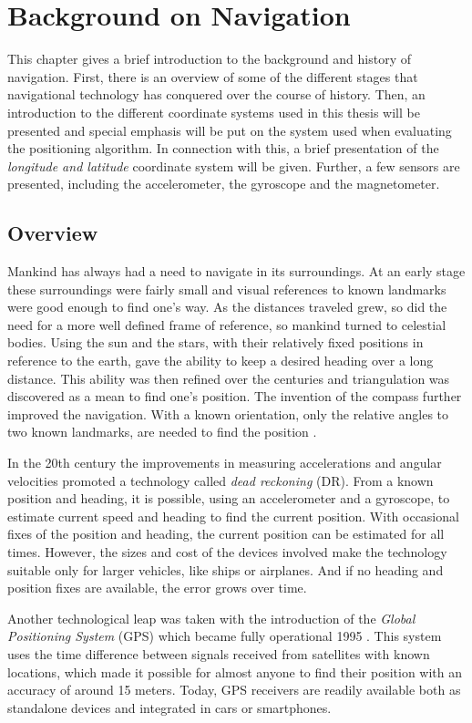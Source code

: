 \documentclass{LTHthesis}
\begin{document}
\chapter{Background on Navigation}
\label{chap:background}
%
This chapter gives a brief introduction to the background and history of navigation. First, there is an overview of some of the different stages that navigational technology has conquered over the course of history. Then, an introduction to the different coordinate systems used in this thesis will be presented and special emphasis will be put on the system used when evaluating the positioning algorithm. In connection with this, a brief presentation of the \emph{longitude and latitude} coordinate system will be given. Further, a few sensors are presented, including the accelerometer, the gyroscope and the magnetometer.
%
\section{Overview}
%
Mankind has always had a need to navigate in its surroundings. At an early stage these surroundings were fairly small and visual references to known landmarks were good enough to find one's way. As the distances traveled grew, so did the need for a more well defined frame of reference, so mankind turned to celestial bodies. Using the sun and the stars, with their relatively fixed positions in reference to the earth, gave the ability to keep a desired heading over a long distance. This ability was then refined over the centuries and triangulation was discovered as a mean to find one's position. The invention of the compass further improved the navigation. With a known orientation, only the relative angles to two known landmarks, are needed to find the position \cite{nav}. 

In the 20th century the improvements in measuring accelerations and angular velocities promoted a technology called \emph{dead reckoning} (DR)\cite{gson12,fig_fra10}. From a known position and heading, it is possible, using an accelerometer and a gyroscope, to estimate current speed and heading to find the current position. With occasional fixes of the position and heading, the current position can be estimated for all times. However, the sizes and cost of the devices involved make the technology suitable only for larger vehicles, like ships or airplanes. And if no heading and position fixes are available, the error grows over time.

Another technological leap was taken with the introduction of the \emph{Global Positioning System} (GPS) which became fully operational 1995 \cite{gps}. This system uses the time difference between signals received from satellites with known locations, which made it possible for almost anyone to find their position with an accuracy of around 15 meters. Today, GPS receivers are readily available both as standalone devices and integrated in cars or smartphones.
\end{document}

